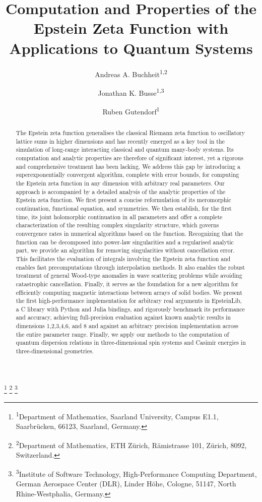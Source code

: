 \documentclass[]{amsart}
\newcommand{\new}[1]{#1}
\numberwithin{mythm}{section}
\begin{document}
\title[Computation and properties of the Epstein zeta function]{Computation and Properties of the Epstein Zeta Function with Applications to Quantum Systems}

\author[Buchheit]{Andreas A. Buchheit\textsuperscript{1,2}}
\author[Busse]{Jonathan K. Busse\textsuperscript{1,3}}
\author[Gutendorf]{Ruben Gutendorf\textsuperscript{1}}

\thanks{\textsuperscript{1}Department of Mathematics, Saarland University, Campus E1.1, Saarbrücken, 66123, Saarland, Germany.}
\thanks{\textsuperscript{2}Department of Mathematics, ETH Zürich, Rämistrasse 101, Zürich, 8092, Switzerland.}
\thanks{\textsuperscript{3}Institute of Software Technology, High-Performance Computing Department, German Aerospace Center (DLR), Linder Höhe, Cologne, 51147, North Rhine-Westphalia, Germany.}


\begin{abstract}
The Epstein zeta function generalises the classical Riemann zeta function to oscillatory lattice sums in higher dimensions and has recently emerged as a key tool in the simulation of long-range interacting classical and quantum many-body systems. Its computation and analytic properties are therefore of significant interest, yet a rigorous and comprehensive treatment has been lacking.
We address this gap by introducing a superexponentially convergent algorithm, complete with error bounds, for computing the Epstein zeta function in any dimension with arbitrary real parameters. Our approach is accompanied by a detailed analysis of the analytic properties of the Epstein zeta function. \new{We first present a concise reformulation of its meromorphic continuation, functional equation, and symmetries. We then establish, for the first time, its joint holomorphic continuation in all parameters and offer a complete characterization of the resulting complex singularity structure, which governs convergence rates in numerical algorithms based on the function.} Recognizing that the function can be decomposed into \new{power-law singularities and a regularised analytic part, we provide an algorithm for removing singularities without cancellation error}. This facilitates the evaluation of integrals involving the Epstein zeta function and enables fast precomputations through interpolation methods. \new{It also enables the robust treatment of general Wood-type anomalies in wave scattering problems while avoiding catastrophic cancellation. Finally, it serves as the foundation for a new algorithm for efficiently computing magnetic interactions between arrays of solid bodies.} We present the first high-performance implementation for arbitrary real arguments in EpsteinLib, a C library with Python \new{and Julia} bindings, and rigorously benchmark its performance and accuracy, achieving full-precision evaluation against known analytic results \new{in dimensions 1,2,3,4,6, and 8} and \new{against an arbitrary precision implementation} across the entire parameter range. Finally, we apply our methods to the computation of quantum dispersion relations in \new{three-dimensional} spin systems and Casimir energies in \new{three-dimensional} geometries.
\end{abstract}
\end{document}
